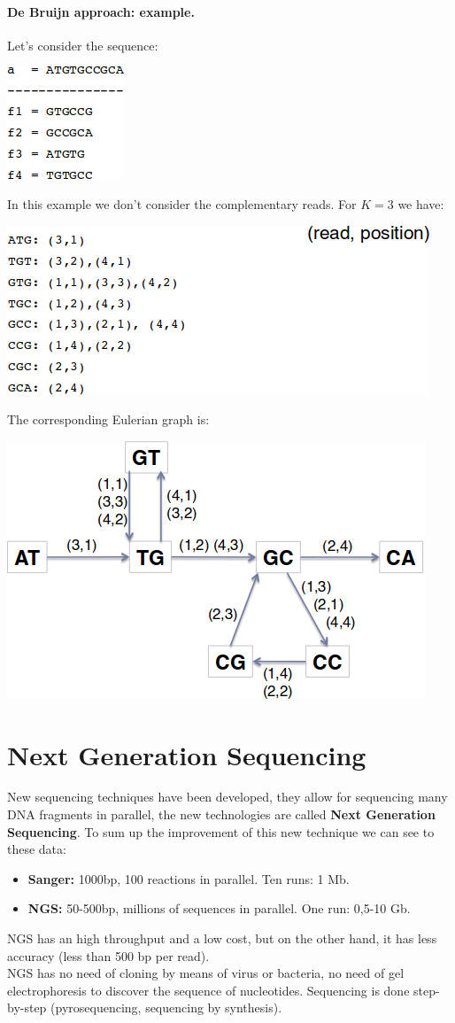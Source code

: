 \paragraph*{De Bruijn approach: example.} Let's consider the sequence:
\begin{center}
	\includegraphics[width=0.2\columnwidth]{img/exampledeb}
\end{center} 
In this example we don't consider the complementary reads. For $K=3$ we have:
\begin{center}
	\includegraphics[width=0.8\columnwidth]{img/exampledeb2}
\end{center}
The corresponding Eulerian graph is:
\begin{center}
	\includegraphics[width=0.7\columnwidth]{img/exampledeb3}
\end{center}

\section{Next Generation Sequencing}
New sequencing techniques have been developed, they allow for sequencing many DNA fragments in parallel, the new technologies are called \textbf{Next Generation Sequencing}. To sum up the improvement of this new technique we can see to these data:
\begin{itemize}
	\item \textbf{Sanger:} 1000bp, 100 reactions in parallel. Ten runs: 1 Mb.
	\item \textbf{NGS:} 50-500bp, millions of sequences in parallel. One run: 0,5-10 Gb.
\end{itemize}
NGS has an high throughput and a low cost, but on the other hand, it has less accuracy (less than 500 bp per read).\\
NGS has no need of cloning by means of virus or bacteria, no need of gel electrophoresis to discover the sequence of nucleotides. Sequencing is done step-by-step (pyrosequencing, sequencing by synthesis).

